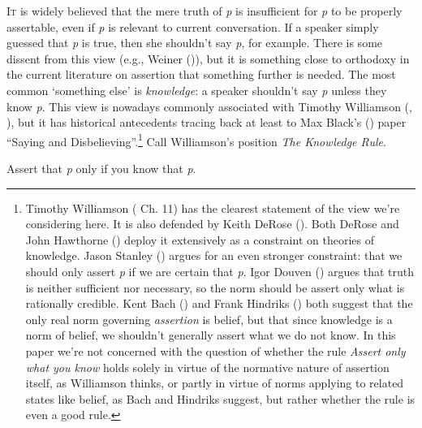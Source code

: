 \documentclass[
  11pt,
  letterpaper,
  DIV=11,
  numbers=noendperiod,
  twoside]{scrartcl}
\providecommand{\tightlist}{%
  \setlength{\itemsep}{0pt}\setlength{\parskip}{0pt}}
\begin{document}
\lettrine{I}{t} is widely believed that the mere truth of \emph{p} is
insufficient for \emph{p} to be properly assertable, even if \emph{p} is
relevant to current conversation. If a speaker simply guessed that
\emph{p} is true, then she shouldn't say \emph{p}, for example. There is
some dissent from this view (e.g., Weiner
()), but it is something close to
orthodoxy in the current literature on assertion that something further
is needed. The most common `something else' is \emph{knowledge}: a
speaker shouldn't say \emph{p} unless they know \emph{p}. This view is
nowadays commonly associated with Timothy Williamson
(,
), but it has historical
antecedents tracing back at least to Max Black's
() paper ``Saying and
Disbelieving''.\footnote{Timothy Williamson
  ( Ch. 11) has the
  clearest statement of the view we're considering here. It is also
  defended by Keith DeRose (). Both
  DeRose and John Hawthorne () deploy
  it extensively as a constraint on theories of knowledge. Jason Stanley
  () argues for an even stronger
  constraint: that we should only assert \emph{p} if we are certain that
  \emph{p}. Igor Douven () argues that
  truth is neither sufficient nor necessary, so the norm should be
  assert only what is rationally credible. Kent Bach
  () and Frank Hindriks
  () both suggest that the only real
  norm governing \emph{assertion} is belief, but that since knowledge is
  a norm of belief, we shouldn't generally assert what we do not know.
  In this paper we're not concerned with the question of whether the
  rule \emph{Assert only what you know} holds solely in virtue of the
  normative nature of assertion itself, as Williamson thinks, or partly
  in virtue of norms applying to related states like belief, as Bach and
  Hindriks suggest, but rather whether the rule is even a good rule.}
Call Williamson's position \emph{The Knowledge Rule}.

\begin{description}
\tightlist
\item[The Knowledge Rule]
Assert that \emph{p} only if you know that \emph{p}.
\end{description}
\end{document}
